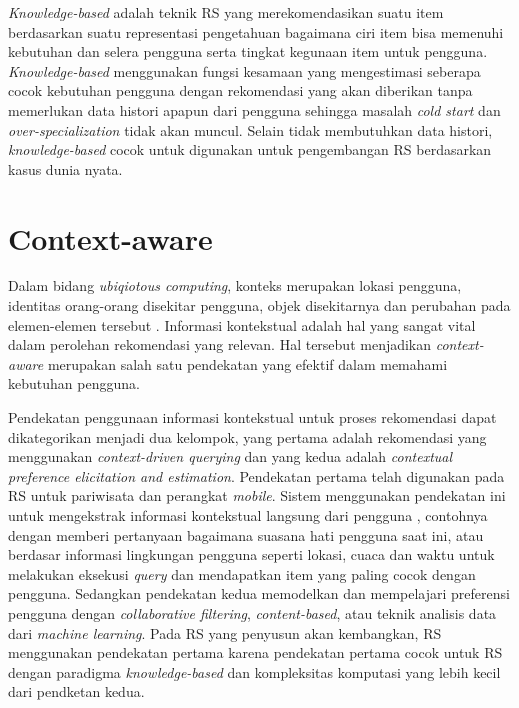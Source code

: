 \par
\textit{Knowledge-based} adalah teknik RS yang merekomendasikan suatu item berdasarkan suatu representasi pengetahuan bagaimana ciri item bisa memenuhi kebutuhan dan selera pengguna serta tingkat kegunaan item untuk pengguna. \textit{Knowledge-based}  menggunakan fungsi kesamaan yang mengestimasi seberapa cocok kebutuhan pengguna dengan rekomendasi yang akan diberikan tanpa memerlukan data histori apapun dari pengguna sehingga masalah \textit{cold start} dan \textit{over-specialization} tidak akan muncul. Selain tidak membutuhkan data histori, \textit{knowledge-based} cocok untuk digunakan untuk pengembangan RS berdasarkan kasus dunia nyata.

\section{Context-aware}

Dalam bidang \textit{ubiqiotous computing}, konteks merupakan lokasi pengguna, identitas orang-orang disekitar pengguna, objek disekitarnya dan perubahan pada elemen-elemen tersebut \cite{ricci2011book}. Informasi kontekstual adalah hal yang sangat vital dalam perolehan rekomendasi yang relevan. Hal tersebut menjadikan \textit{context-aware} merupakan salah satu pendekatan yang efektif dalam memahami kebutuhan pengguna.

Pendekatan penggunaan informasi kontekstual untuk proses rekomendasi dapat dikategorikan menjadi dua kelompok, yang pertama adalah rekomendasi yang menggunakan \textit{context-driven querying} dan yang kedua adalah \textit{contextual preference elicitation and estimation}\cite{ricci2011book}. Pendekatan pertama telah digunakan pada RS untuk pariwisata dan perangkat \textit{mobile}. Sistem menggunakan pendekatan ini untuk mengekstrak informasi kontekstual langsung dari pengguna \cite{van2004context}\cite{abowd1997cyberguide}, contohnya dengan memberi pertanyaan bagaimana suasana hati pengguna saat ini, atau berdasar informasi lingkungan pengguna seperti lokasi, cuaca dan waktu untuk melakukan eksekusi \textit{query} dan mendapatkan item yang paling cocok dengan pengguna. Sedangkan pendekatan kedua memodelkan dan mempelajari preferensi pengguna dengan \textit{collaborative filtering}, \textit{content-based}, atau teknik analisis data dari \textit{machine learning}. Pada RS yang penyusun akan kembangkan, RS menggunakan pendekatan pertama karena pendekatan pertama cocok untuk RS dengan paradigma \textit{knowledge-based} \cite{ricci2011book} dan kompleksitas komputasi yang lebih kecil dari pendketan kedua.

